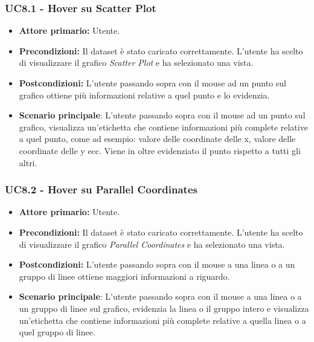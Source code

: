 \subsubsection{UC8.1 - Hover su Scatter Plot}
\label{sec:UC8.1}
\begin{itemize}
    \item \textbf{Attore primario:} Utente.
    \item \textbf{Precondizioni:} Il dataset è stato caricato correttamente. L'utente ha scelto di visualizzare il grafico \textit{Scatter Plot} e ha selezionato una vista.
    \item \textbf{Postcondizioni:} L'utente passando sopra con il mouse ad un punto sul grafico ottiene più informazioni relative a quel punto e lo evidenzia.
    \item \textbf{Scenario principale}: L'utente passando sopra con il mouse ad un punto sul grafico, visualizza un'etichetta che contiene informazioni più complete relative a quel punto, come ad esempio: valore delle coordinate delle x, valore delle coordinate delle y ecc. Viene in oltre evidenziato il punto rispetto a tutti gli altri. 
\end{itemize}

\subsubsection{UC8.2 - Hover su Parallel Coordinates}
\label{sec:UC8.2}
\begin{itemize}
    \item \textbf{Attore primario:} Utente.
    \item \textbf{Precondizioni:} Il dataset è stato caricato correttamente. L'utente ha scelto di visualizzare il grafico \textit{Parallel Coordinates} e ha selezionato una vista.
    \item \textbf{Postcondizioni:} L'utente passando sopra con il mouse a una linea o a un gruppo di linee ottiene maggiori informazioni a riguardo.
    \item \textbf{Scenario principale}: L'utente passando sopra con il mouse a una linea o a un gruppo di linee sul grafico, evidenzia la linea o il gruppo intero e visualizza un'etichetta che contiene informazioni più complete relative a quella linea o a quel gruppo di linee.
\end{itemize}

